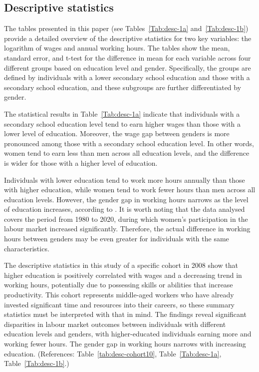 \documentclass[12pt]{article}
\begin{document}
\subsection{Descriptive statistics}

The tables presented in this paper (see Tables~\ref{Tab:desc-1a} and~\ref{Tab:desc-1b}) provide a detailed overview of the
descriptive statistics for two key variables: the logarithm of wages and annual working hours. The tables show the mean,
standard error, and t-test for the difference in mean for each variable across four different groups based on education
level and gender. Specifically, the groups are defined by individuals with a lower secondary school education and those
with a secondary school education, and these subgroups are further differentiated by gender.
\par
The statistical results in Table~\ref{Tab:desc-1a} indicate that individuals with a secondary school education level tend to earn
higher wages than those with a lower level of education. Moreover, the wage gap between genders is more pronounced among
those with a secondary school education level. In other words, women tend to earn less than men across all education
levels, and the difference is wider for those with a higher level of education.
\par
Individuals with lower education tend to work more hours annually than those with higher education, while women tend to
work fewer hours than men across all education levels. However, the gender gap in working hours narrows as the level of
education increases, according to \citet{goldin}. It is worth noting that the data analysed covers the period from 1980
to 2020, during which women's participation in the labour market increased significantly. Therefore, the actual
difference in working hours between genders may be even greater for individuals with the same characteristics.
\par
The descriptive statistics in this study of a specific cohort in 2008 show that higher education is positively
correlated with wages and a decreasing trend in working hours, potentially due to possessing skills or abilities that
increase productivity. This cohort represents middle-aged workers who have already invested significant time and
resources into their careers, so these summary statistics must be interpreted with that in mind. The findings reveal
significant disparities in labour market outcomes between individuals with different education levels and genders, with
higher-educated individuals earning more and working fewer hours. The gender gap in working hours narrows with
increasing education. (References: Table~\ref{tab:desc-cohort10}, Table~\ref{Tab:desc-1a}, Table~\ref{Tab:desc-1b}.)
\end{document}
